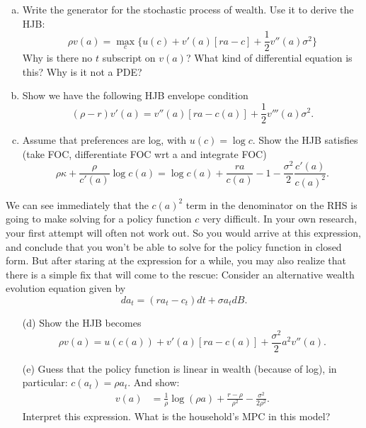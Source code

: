 \documentclass[11pt]{extarticle}
\theoremstyle{plain}
\theoremstyle{definition}
\begin{document}
\begin{enumerate}[(a)]
\item Write the generator for the stochastic process of wealth. Use it to derive the HJB:
\begin{equation*}
	\rho v(a) = \max_c \bigg\{ u(c) + v'(a) [ra - c] + \frac{1}{2} v''(a) \sigma^2 \bigg\}
\end{equation*}
Why is there no $t$ subscript on $v(a)$? What kind of differential equation is this? Why is it not a PDE?

\item Show we have the following HJB envelope condition 
\begin{equation*}
	(\rho - r) v'(a) = v''(a) [ra - c(a)] + \frac{1}{2} v'''(a) \sigma^2.
\end{equation*}

\item Assume that preferences are log, with $u(c) = \log c$. Show the HJB satisfies (take FOC, differentiate FOC wrt a and integrate FOC)
\begin{equation*}
	\rho \kappa + \frac{\rho}{c'(a)} \log c(a) = \log c(a) + \frac{r a}{c(a)} - 1 - \frac{\sigma^2}{2} \frac{c'(a)}{c(a)^2}.
\end{equation*}
\end{enumerate}


\vspace{5mm}
\noindent
 We can see immediately that the $c(a)^2$ term in the denominator on the RHS is going to make solving for a policy function $c$ very difficult. In your own research, your first attempt will often not work out. So you would arrive at this expression, and conclude that you won't be able to solve for the policy function in closed form. But after staring at the expression for a while, you may also realize that there is a simple fix that will come to the rescue: Consider an alternative wealth evolution equation given by 
 \begin{equation*}
	 da_t = (r a_t - c_t)dt + \sigma a_t dB.
 \end{equation*}


\begin{enumerate} 
\item [(d)] Show the HJB becomes 
\begin{equation*}
	\rho v(a) = u(c(a)) + v'(a)[ra -c(a)] + \frac{\sigma^2}{2} a^2 v''(a). 
\end{equation*}

\item [(e)] Guess that the policy function is linear in wealth (because of log), in particular: $c(a_t) = \rho a_t$. And show: 
\begin{align*}
	v(a) &= \frac{1}{\rho} \log(\rho a) + \frac{r - \rho}{\rho^2} - \frac{\sigma^2}{2\rho^2}.
\end{align*} 
Interpret this expression. What is the household's MPC in this model? 

\end{enumerate}
\end{document}
